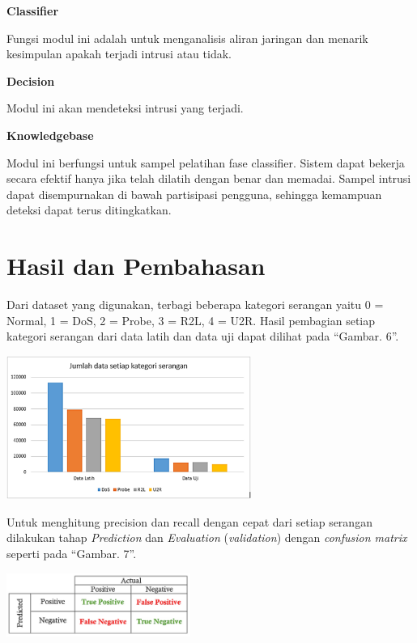 \documentclass[conference]{IEEEtran}
\begin{document}
\noindent \textbf{Classifier}

Fungsi modul ini adalah untuk menganalisis aliran jaringan dan menarik kesimpulan apakah terjadi intrusi atau tidak.

\noindent \textbf{Decision}

Modul ini akan mendeteksi intrusi yang terjadi.

\noindent \textbf{Knowledgebase}

Modul ini berfungsi untuk sampel pelatihan fase classifier. Sistem dapat bekerja secara efektif hanya jika telah dilatih dengan benar dan memadai. Sampel intrusi dapat disempurnakan di bawah partisipasi pengguna, sehingga kemampuan deteksi dapat terus ditingkatkan.

\section{Hasil dan Pembahasan}

Dari dataset yang digunakan, terbagi beberapa kategori serangan yaitu 0 = Normal, 1 = DoS, 2 = Probe, 3 = R2L, 4 = U2R.
Hasil pembagian setiap kategori serangan dari data latih dan data uji dapat dilihat pada ``Gambar. 6''.\vspace{6pt}

\begin{minipage}{\linewidth}
    \centerline{\includegraphics[width=80mm]{Gambar/Gbr011.jpg}}
    \label{fig6}
    \end{minipage}
    \vspace{6pt}

Untuk menghitung precision dan recall dengan cepat dari setiap serangan dilakukan
tahap \emph{Prediction} dan \emph{Evaluation} (\emph{validation}) dengan \emph{confusion matrix}
seperti pada ``Gambar. 7''.

\begin{minipage}{\linewidth}
\centerline{\includegraphics[width=60mm]{Gambar/Gbr005.jpg}}
\label{fig7}
\end{minipage}
\vspace{6pt}
\end{document}
